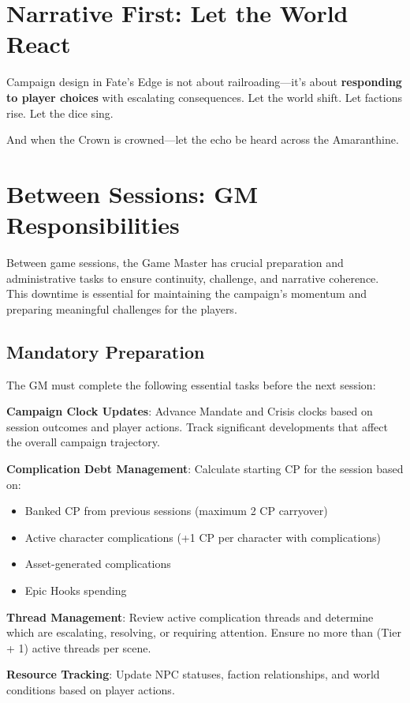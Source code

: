 \section*{Narrative First: Let the World React}

Campaign design in Fate's Edge is not about railroading—it's about \textbf{responding to player choices} with escalating consequences. Let the world shift. Let factions rise. Let the dice sing.

And when the Crown is crowned—let the echo be heard across the Amaranthine.

\section{Between Sessions: GM Responsibilities}

Between game sessions, the Game Master has crucial preparation and administrative tasks to ensure continuity, challenge, and narrative coherence. This downtime is essential for maintaining the campaign's momentum and preparing meaningful challenges for the players.
\subsection{Mandatory Preparation}

The GM must complete the following essential tasks before the next session:

\textbf{Campaign Clock Updates}: Advance Mandate and Crisis clocks based on session outcomes and player actions. Track significant developments that affect the overall campaign trajectory.

\textbf{Complication Debt Management}: Calculate starting CP for the session based on:
\begin{itemize}
    \item Banked CP from previous sessions (maximum 2 CP carryover)
    \item Active character complications (+1 CP per character with complications)
    \item Asset-generated complications
    \item Epic Hooks spending
\end{itemize}

\textbf{Thread Management}: Review active complication threads and determine which are escalating, resolving, or requiring attention. Ensure no more than (Tier + 1) active threads per scene.

\textbf{Resource Tracking}: Update NPC statuses, faction relationships, and world conditions based on player actions.

